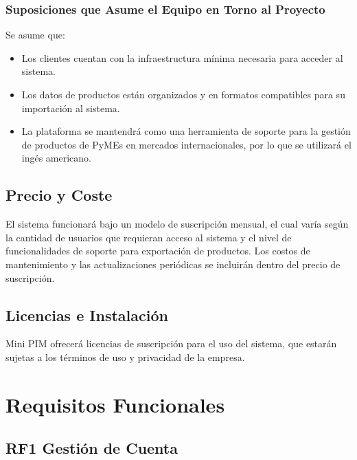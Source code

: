 \documentclass{article}
\begin{document}
\subsubsection{Suposiciones que Asume el Equipo en Torno al Proyecto}
Se asume que:
\begin{itemize}
    \item Los clientes cuentan con la infraestructura mínima necesaria para acceder al sistema.
    \item Los datos de productos están organizados y en formatos compatibles para su importación al sistema.
    \item La plataforma se mantendrá como una herramienta de soporte para la gestión de productos de PyMEs en mercados internacionales, por lo que se utilizará el ingés americano.
\end{itemize}

\subsection{Precio y Coste}
El sistema funcionará bajo un modelo de suscripción mensual, el cual varía según la cantidad de usuarios que requieran acceso al sistema y el nivel de funcionalidades de soporte para exportación de productos. Los costos de mantenimiento y las actualizaciones periódicas se incluirán dentro del precio de suscripción.

\subsection{Licencias e Instalación}
Mini PIM ofrecerá licencias de suscripción para el uso del sistema, que estarán sujetas a los términos de uso y privacidad de la empresa.
\section{Requisitos Funcionales}
\subsection{RF1 Gestión de Cuenta}
\end{document}

